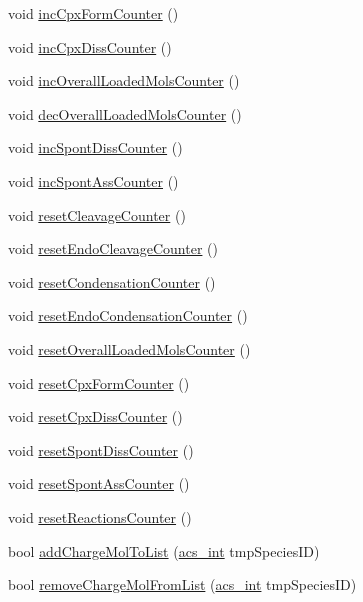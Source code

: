 \begin{DoxyCompactItemize}
\item 
void \hyperlink{a00014_afd3d590aa9b6a644cb360cc5fd47e16a}{inc\-Cpx\-Form\-Counter} ()
\item 
void \hyperlink{a00014_a73f88a08ff9206e48063cccb1729ee6b}{inc\-Cpx\-Diss\-Counter} ()
\item 
void \hyperlink{a00014_a719b14624d9a2f891b8d4eb47649a00e}{inc\-Overall\-Loaded\-Mols\-Counter} ()
\item 
void \hyperlink{a00014_a6686b0489ed94f11c4b03c011978f9af}{dec\-Overall\-Loaded\-Mols\-Counter} ()
\item 
void \hyperlink{a00014_a0c22436405fc1ec79d33485c2e80d817}{inc\-Spont\-Diss\-Counter} ()
\item 
void \hyperlink{a00014_aa2632ded9c384c3183c3ebebb530e2d7}{inc\-Spont\-Ass\-Counter} ()
\item 
void \hyperlink{a00014_a0b1e324c651c86cb54279e022c14dc6d}{reset\-Cleavage\-Counter} ()
\item 
void \hyperlink{a00014_a3362d147de095640619d9b44f7f20bba}{reset\-Endo\-Cleavage\-Counter} ()
\item 
void \hyperlink{a00014_ac7deab8db2f581077da735c3542d8f1b}{reset\-Condensation\-Counter} ()
\item 
void \hyperlink{a00014_a55cff0bc2f8de4d3e4db471cad580a86}{reset\-Endo\-Condensation\-Counter} ()
\item 
void \hyperlink{a00014_abc04de785dddab4703fdcf52ccdf85f9}{reset\-Overall\-Loaded\-Mols\-Counter} ()
\item 
void \hyperlink{a00014_a4cf4413f3028f8c5e33991ad5ba18e21}{reset\-Cpx\-Form\-Counter} ()
\item 
void \hyperlink{a00014_a987dc7b9f211f34564343ee0eaa20dc1}{reset\-Cpx\-Diss\-Counter} ()
\item 
void \hyperlink{a00014_a9c22cb9b69207398e35c9c155e2e35ce}{reset\-Spont\-Diss\-Counter} ()
\item 
void \hyperlink{a00014_a98baed580212dad8ef48a22bfe7e1295}{reset\-Spont\-Ass\-Counter} ()
\item 
void \hyperlink{a00014_a5c8713237992b28c39199a7aea3f9ea0}{reset\-Reactions\-Counter} ()
\item 
bool \hyperlink{a00014_a7981c34d16c0b1e9e6ca3ea69aa3a8a3}{add\-Charge\-Mol\-To\-List} (\hyperlink{a00072_a8d277355641a098190360234e2ebde35}{acs\-\_\-int} tmp\-Species\-I\-D)
\item 
bool \hyperlink{a00014_aa4830018af0b99eddefcdefad877b305}{remove\-Charge\-Mol\-From\-List} (\hyperlink{a00072_a8d277355641a098190360234e2ebde35}{acs\-\_\-int} tmp\-Species\-I\-D)

\end{DoxyCompactItemize}
